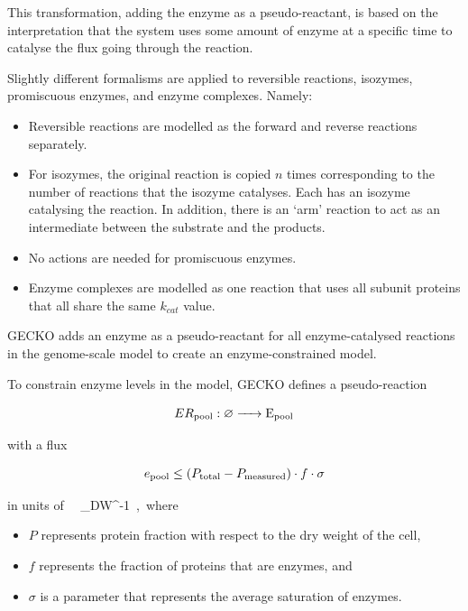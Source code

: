 This transformation, adding the enzyme as a pseudo-reactant, is based on the interpretation that the system uses some amount of enzyme at a specific time to catalyse the flux going through the reaction.


Slightly different formalisms are applied to reversible reactions, isozymes, promiscuous enzymes, and enzyme complexes.  Namely:
\begin{itemize}
  \item Reversible reactions are modelled as the forward and reverse reactions separately.
  \item For isozymes, the original reaction is copied $n$ times corresponding to the number of reactions that the isozyme catalyses. Each has an isozyme catalysing the reaction.
  In addition, there is an `arm' reaction to act as an intermediate between the substrate and the products.
  \item No actions are needed for promiscuous enzymes.
  \item Enzyme complexes are modelled as one reaction that uses all subunit proteins that all share the same $k_{cat}$ value.
\end{itemize}

GECKO adds an enzyme as a pseudo-reactant for all enzyme-catalysed reactions in the genome-scale model to create an enzyme-constrained model.

To constrain enzyme levels in the model, GECKO defines a pseudo-reaction

\begin{equation}
  ER_{\mathrm{pool}}: \varnothing \ce{ -> E_{pool} }
  \label{eq:model-gecko-enzyme-pool}
\end{equation}

with a flux

\begin{equation}
  e_{\mathrm{pool}} \leq (P_{\mathrm{total}} - P_{\mathrm{measured}}) \cdot f \cdot \sigma
  \label{eq:model-gecko-enzyme-pool-flux}
\end{equation}

in units of \SI{}{\gram~\gram_{DW}^{-1}}, where

\begin{itemize}
  \item $P$ represents protein fraction with respect to the dry weight of the cell,
  \item $f$ represents the fraction of proteins that are enzymes, and
  \item $\sigma$ is a parameter that represents the average saturation of enzymes.
\end{itemize}

